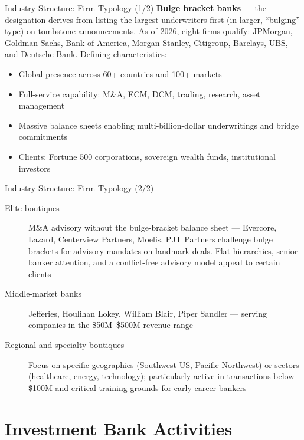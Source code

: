 \documentclass[aspectratio=169]{beamer}
\begin{document}
\begin{frame}{Industry Structure: Firm Typology (1/2)}
\textbf{Bulge bracket banks} --- the designation derives from listing the largest underwriters first (in larger, ``bulging'' type) on tombstone announcements. As of 2026, eight firms qualify: JPMorgan, Goldman Sachs, Bank of America, Morgan Stanley, Citigroup, Barclays, UBS, and Deutsche Bank. Defining characteristics:
\begin{itemize}
  \item Global presence across 60+ countries and 100+ markets
  \item Full-service capability: M\&A, ECM, DCM, trading, research, asset management
  \item Massive balance sheets enabling multi-billion-dollar underwritings and bridge commitments
  \item Clients: Fortune 500 corporations, sovereign wealth funds, institutional investors
\end{itemize}
\end{frame}

\begin{frame}{Industry Structure: Firm Typology (2/2)}
\begin{description}
  \item[Elite boutiques] M\&A advisory without the bulge-bracket balance sheet --- Evercore, Lazard, Centerview Partners, Moelis, PJT Partners challenge bulge brackets for advisory mandates on landmark deals. Flat hierarchies, senior banker attention, and a conflict-free advisory model appeal to certain clients
  \item[Middle-market banks] Jefferies, Houlihan Lokey, William Blair, Piper Sandler --- serving companies in the \$50M--\$500M revenue range
  \item[Regional and specialty boutiques] Focus on specific geographies (Southwest US, Pacific Northwest) or sectors (healthcare, energy, technology); particularly active in transactions below \$100M and critical training grounds for early-career bankers
\end{description}
\end{frame}


\section{Investment Bank Activities}
\end{document}
